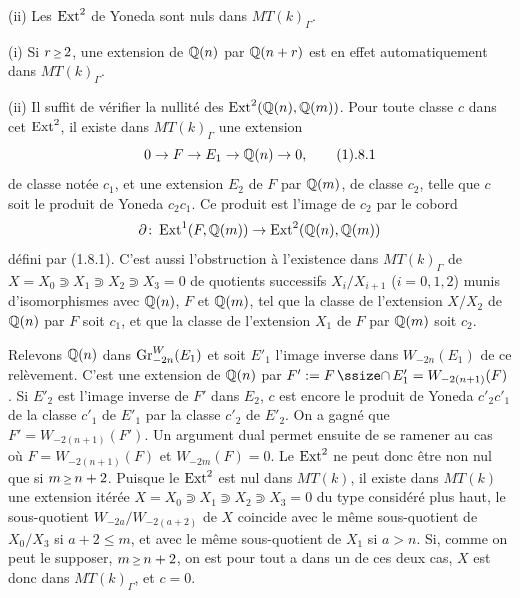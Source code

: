\noindent
{\sans (ii)}
Les $\text{\rm Ext}^2$ de Yoneda sont nuls dans
$MT(k)_\Gamma$.
\endproclaim

\quad (i) Si $r\Ge 2$, une
extension de ${\Bbb Q}(n)$ par ${\Bbb Q}(n+r)$ est en
effet automatiquement dans $MT(k)_\Gamma$.

\noindent
(ii)
Il suffit de v\'erifier la nullit\'e des
$\text{\rm Ext}^2({\Bbb Q}(n),{\Bbb Q}(m))$.
Pour toute classe $c$ dans cet $\text{\rm Ext}^2$, il
existe dans $MT(k)_\Gamma$ une extension
$$
0\to F\to E_1\to\dbQ(n)\to 0,
\tag1.8.1
$$
de classe not\'ee $c_1$, et une extension
$E_2$ de $F$ par ${\Bbb Q}(m)$, de classe $c_2$,
telle que $c$ soit le produit de Yoneda
$c_2c_1$.
Ce produit est l'image de $c_2$ par le cobord
$$
\partial\colon\, \text{\rm Ext}^1(F,{\Bbb Q}(m))\to
\text{\rm Ext}^2({\Bbb Q}(n),{\Bbb Q}(m))
$$
d\'efini par (1.8.1).
C'est aussi l'obstruction \`a l'existence dans
$MT(k)_\Gamma$ de\break
$X=X_0\Supset X_1\Supset
X_2\Supset X_3=0$  de quotients successifs
$X_i/X_{i+1}$ ($i=0,1,2$) munis\break
d'isomorphismes avec ${\Bbb Q}(n)$, $F$ et
${\Bbb Q}(m)$, tel que la classe de l'extension
$X/X_2$ de ${\Bbb Q}(n)$ par $F$ soit $c_1$, et
que la classe de l'extension $X_1$ de $F$ par
${\Bbb Q}(m)$ soit $c_2$.

Relevons ${\Bbb Q}(n)$ dans  $\text{\rm Gr}_{-2n}^W(E_1)$ et
soit $E'_1$ l'image inverse dans
$W_{-2n}(E_1)$ de ce rel\`evement.
C'est une extension de ${\Bbb Q}(n)$ par $F':=
F\CAP E'_1=W_{-2(n+1)}(F)$.
Si $E'_2$ est l'image inverse de $F'$ dans
$E_2$, $c$ est encore le produit de Yoneda
$c'_2c'_1$ de la classe $c'_1$ de $E'_1$ par
la classe $c'_2$ de $E'_2$.
On a gagn\'e que $F'=W_{-2(n+1)}(F')$.
Un argument dual permet ensuite de se ramener
au cas o\`u $F=W_{-2(n+1)}(F)$ et
$W_{-2m}(F)=0$.
Le $\text{\rm Ext}^2$ ne peut donc \^{e}tre non nul que
si $m\Ge n+2$.
Puisque le $\text{\rm Ext}^2$ est nul dans $MT(k)$, il
existe dans $MT(k)$ une extension it\'er\'ee
$X=X_0\Supset X_1\Supset X_2\Supset X_3=0$ du
type consid\'er\'e plus haut, le sous-quotient
$W_{-2a}/W_{-2(a+2)}$ de $X$ coincide avec le
m\^{e}me sous-quotient de $X_0/X_3$ si $a+2\le
m$, et avec le m\^{e}me sous-quotient de $X_1$
si $a>n$.
Si, comme on peut le supposer, $m\Ge n+2$, on
est pour tout a dans un de ces deux cas, $X$
est donc dans $MT(k)_\Gamma$, et $c=0$.
\enddemo





